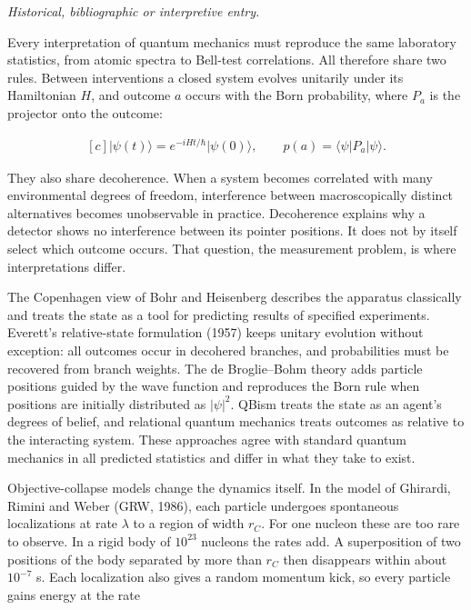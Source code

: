 \documentclass[11pt,oneside]{book}
\newenvironment{centeredalign}{\[\begin{gathered}[c]}{\end{gathered}\]}
\newcommand{\ket}[1]{\lvert #1\rangle}
\begin{document}
\label{topic:interpretations-of-quantum-mechanics}

\par\smallskip\noindent\textit{Historical, bibliographic or interpretive entry.}

Every interpretation of quantum mechanics must reproduce the same laboratory statistics, from atomic spectra to Bell-test correlations. All therefore share two rules. Between interventions a closed system evolves unitarily under its Hamiltonian \(H\), and outcome \(a\) occurs with the Born probability, where \(P_a\) is the projector onto the outcome:

\begin{centeredalign}
\ket{\psi(t)}=e^{-iHt/\hbar}\ket{\psi(0)},\qquad p(a)=\langle\psi|P_a|\psi\rangle .
\end{centeredalign}

They also share decoherence. When a system becomes correlated with many environmental degrees of freedom, interference between macroscopically distinct alternatives becomes unobservable in practice. Decoherence explains why a detector shows no interference between its pointer positions. It does not by itself select which outcome occurs. That question, the measurement problem, is where interpretations differ.

The Copenhagen view of Bohr and Heisenberg describes the apparatus classically and treats the state as a tool for predicting results of specified experiments. Everett's relative-state formulation (1957) keeps unitary evolution without exception: all outcomes occur in decohered branches, and probabilities must be recovered from branch weights. The de Broglie--Bohm theory adds particle positions guided by the wave function and reproduces the Born rule when positions are initially distributed as \(|\psi|^2\). QBism treats the state as an agent's degrees of belief, and relational quantum mechanics treats outcomes as relative to the interacting system. These approaches agree with standard quantum mechanics in all predicted statistics and differ in what they take to exist.

Objective-collapse models change the dynamics itself. In the model of Ghirardi, Rimini and Weber (GRW, 1986), each particle undergoes spontaneous localizations at rate \(\lambda\) to a region of width \(r_C\). For one nucleon these are too rare to observe. In a rigid body of \(10^{23}\) nucleons the rates add. A superposition of two positions of the body separated by more than \(r_C\) then disappears within about \(10^{-7}\) s. Each localization also gives a random momentum kick, so every particle gains energy at the rate
\end{document}
